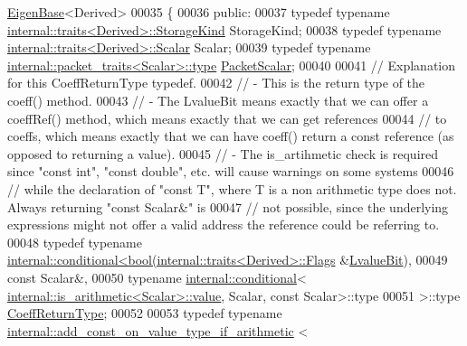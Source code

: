 \begin{DoxyCode}
      \hyperlink{group___core___module_struct_eigen_1_1_eigen_base}{EigenBase}<Derived>
00035 \{
00036   \textcolor{keyword}{public}:
00037     \textcolor{keyword}{typedef} \textcolor{keyword}{typename} \hyperlink{struct_eigen_1_1internal_1_1traits}{internal::traits<Derived>::StorageKind} 
      StorageKind;
00038     \textcolor{keyword}{typedef} \textcolor{keyword}{typename} \hyperlink{struct_eigen_1_1internal_1_1traits}{internal::traits<Derived>::Scalar} Scalar;
00039     \textcolor{keyword}{typedef} \textcolor{keyword}{typename} \hyperlink{group___sparse_core___module}{internal::packet\_traits<Scalar>::type} 
      \hyperlink{group___sparse_core___module}{PacketScalar};
00040 
00041     \textcolor{comment}{// Explanation for this CoeffReturnType typedef.}
00042     \textcolor{comment}{// - This is the return type of the coeff() method.}
00043     \textcolor{comment}{// - The LvalueBit means exactly that we can offer a coeffRef() method, which means exactly that we can
       get references}
00044     \textcolor{comment}{// to coeffs, which means exactly that we can have coeff() return a const reference (as opposed to
       returning a value).}
00045     \textcolor{comment}{// - The is\_artihmetic check is required since "const int", "const double", etc. will cause warnings on
       some systems}
00046     \textcolor{comment}{// while the declaration of "const T", where T is a non arithmetic type does not. Always returning
       "const Scalar&" is}
00047     \textcolor{comment}{// not possible, since the underlying expressions might not offer a valid address the reference could
       be referring to.}
00048     \textcolor{keyword}{typedef} \textcolor{keyword}{typename} \hyperlink{struct_eigen_1_1internal_1_1conditional}{internal::conditional<bool(internal::traits<Derived>::Flags}
      &\hyperlink{group__flags_gae2c323957f20dfdc6cb8f44428eaec1a}{LvalueBit}),
00049                          \textcolor{keyword}{const} Scalar&,
00050                          \textcolor{keyword}{typename} \hyperlink{struct_eigen_1_1internal_1_1conditional}{internal::conditional}<
      \hyperlink{struct_eigen_1_1internal_1_1is__arithmetic}{internal::is\_arithmetic<Scalar>::value}, Scalar, \textcolor{keyword}{const} Scalar>::type
00051                      >::type \hyperlink{class_eigen_1_1internal_1_1_tensor_lazy_evaluator_writable}{CoeffReturnType};
00052 
00053     \textcolor{keyword}{typedef} \textcolor{keyword}{typename} \hyperlink{struct_eigen_1_1internal_1_1add__const__on__value__type__if__arithmetic}{internal::add\_const\_on\_value\_type\_if\_arithmetic}
      <

\end{DoxyCode}
